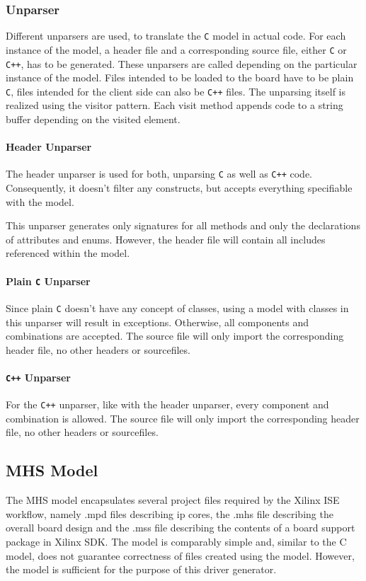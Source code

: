\documentclass{report}
\begin{document}
\subsubsection{Unparser}
\label{sec:gen:unparser}
Different unparsers are used, to translate the \texttt{C} model in actual code. For each instance of the model, a header file and a corresponding source file, either \texttt{C} or \texttt{C++}, has to be generated. These unparsers are called depending on the particular instance of the model. Files intended to be loaded to the board have to be plain \texttt{C}, files intended for the client side can also be \texttt{C++} files. The unparsing itself is realized using the visitor pattern. Each visit method appends code to a string buffer depending on the visited element.

\paragraph{Header Unparser}
The header unparser is used for both, unparsing \texttt{C} as well as \texttt{C++} code. Consequently, it doesn't filter any constructs, but accepts everything specifiable with the model.

This unparser generates only signatures for all methods and only the declarations of attributes and enums. However, the header file will contain all includes referenced within the model.

\paragraph{Plain \texttt{C} Unparser}
Since plain \texttt{C} doesn't have any concept of classes, using a model with classes in this unparser will result in exceptions. Otherwise, all components and combinations are accepted. The source file will only import the corresponding header file, no other headers or sourcefiles.

\paragraph{\texttt{C++} Unparser}
For the \texttt{C++} unparser, like with the header unparser, every component and combination is allowed. The source file will only import the corresponding header file, no other headers or sourcefiles.

\subsection{MHS Model}
The MHS model encapsulates several project files required by the Xilinx ISE workflow, namely .mpd files describing ip cores, the .mhs file describing the overall board design and the .mss file describing the contents of a board support package in Xilinx SDK.
The model is comparably simple and, similar to the C model, does not guarantee correctness of files created using the model. However, the model is sufficient for the purpose of this driver generator.
\end{document}
